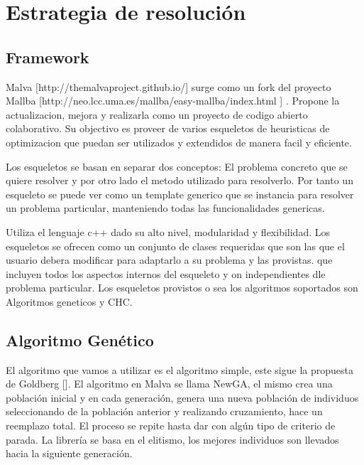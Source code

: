 \chapter{Estrategia de resolución}


\section{Framework}

Malva [http://themalvaproject.github.io/] surge como un fork del proyecto Mallba [http://neo.lcc.uma.es/mallba/easy-mallba/index.html ] . Propone la actualizacion, mejora y realizarla como un proyecto de codigo abierto colaborativo.  Su objectivo es proveer de varios esqueletos de heuristicas de optimizacion que puedan ser utilizados y extendidos de manera facil y eficiente.

Los esqueletos se basan en separar dos conceptos: El problema concreto que se quiere resolver y por otro lado el metodo utilizado para resolverlo. Por tanto un esqueleto se puede ver como un template generico que se instancia para resolver un problema particular, manteniendo todas las funcionalidades genericas.

Utiliza el lenguaje c++ dado su alto nivel, modularidad y flexibilidad. Los esqueletos se ofrecen como un conjunto de clases requeridas que son las que el usuario debera modificar para adaptarlo a su problema y las provistas. que incluyen todos los aspectos internos del esqueleto y on independientes dle problema particular.
Los esqueletos provistos o sea los algoritmos soportados son Algoritmos geneticos y CHC.




\section{Algoritmo Genético}
El algoritmo que vamos a utilizar es el algoritmo simple, este
sigue  la  propuesta  de  Goldberg  [].  El  algoritmo  en  Malva  se
llama NewGA, el mismo crea una población inicial y en
cada  generación,  genera  una  nueva  población  de  individuos
seleccionando  de  la  población  anterior  y  realizando
cruzamiento,  hace  un  reemplazo  total.  El  proceso  se  repite
hasta  dar  con  algún  tipo  de  criterio  de parada.  La  librería se
basa en el elitismo, los mejores individuos son llevados hacia
la siguiente generación.

